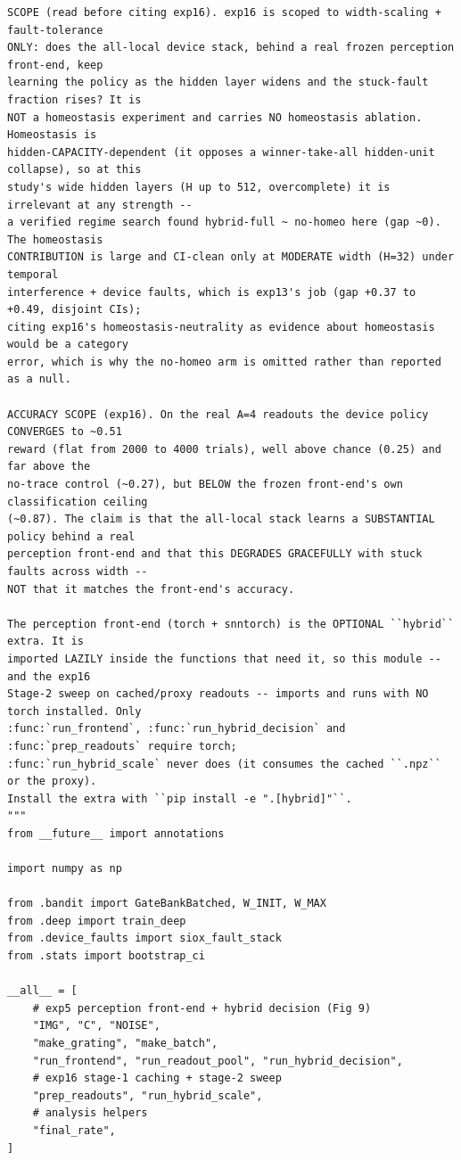 \begin{lstlisting}[caption={mrl\_trace/hybrid.py},label={lst:siox-src-hybrid}]
SCOPE (read before citing exp16). exp16 is scoped to width-scaling + fault-tolerance
ONLY: does the all-local device stack, behind a real frozen perception front-end, keep
learning the policy as the hidden layer widens and the stuck-fault fraction rises? It is
NOT a homeostasis experiment and carries NO homeostasis ablation. Homeostasis is
hidden-CAPACITY-dependent (it opposes a winner-take-all hidden-unit collapse), so at this
study's wide hidden layers (H up to 512, overcomplete) it is irrelevant at any strength --
a verified regime search found hybrid-full ~ no-homeo here (gap ~0). The homeostasis
CONTRIBUTION is large and CI-clean only at MODERATE width (H=32) under temporal
interference + device faults, which is exp13's job (gap +0.37 to +0.49, disjoint CIs);
citing exp16's homeostasis-neutrality as evidence about homeostasis would be a category
error, which is why the no-homeo arm is omitted rather than reported as a null.

ACCURACY SCOPE (exp16). On the real A=4 readouts the device policy CONVERGES to ~0.51
reward (flat from 2000 to 4000 trials), well above chance (0.25) and far above the
no-trace control (~0.27), but BELOW the frozen front-end's own classification ceiling
(~0.87). The claim is that the all-local stack learns a SUBSTANTIAL policy behind a real
perception front-end and that this DEGRADES GRACEFULLY with stuck faults across width --
NOT that it matches the front-end's accuracy.

The perception front-end (torch + snntorch) is the OPTIONAL ``hybrid`` extra. It is
imported LAZILY inside the functions that need it, so this module -- and the exp16
Stage-2 sweep on cached/proxy readouts -- imports and runs with NO torch installed. Only
:func:`run_frontend`, :func:`run_hybrid_decision` and :func:`prep_readouts` require torch;
:func:`run_hybrid_scale` never does (it consumes the cached ``.npz`` or the proxy).
Install the extra with ``pip install -e ".[hybrid]"``.
"""
from __future__ import annotations

import numpy as np

from .bandit import GateBankBatched, W_INIT, W_MAX
from .deep import train_deep
from .device_faults import siox_fault_stack
from .stats import bootstrap_ci

__all__ = [
    # exp5 perception front-end + hybrid decision (Fig 9)
    "IMG", "C", "NOISE",
    "make_grating", "make_batch",
    "run_frontend", "run_readout_pool", "run_hybrid_decision",
    # exp16 stage-1 caching + stage-2 sweep
    "prep_readouts", "run_hybrid_scale",
    # analysis helpers
    "final_rate",
]


\end{lstlisting}

